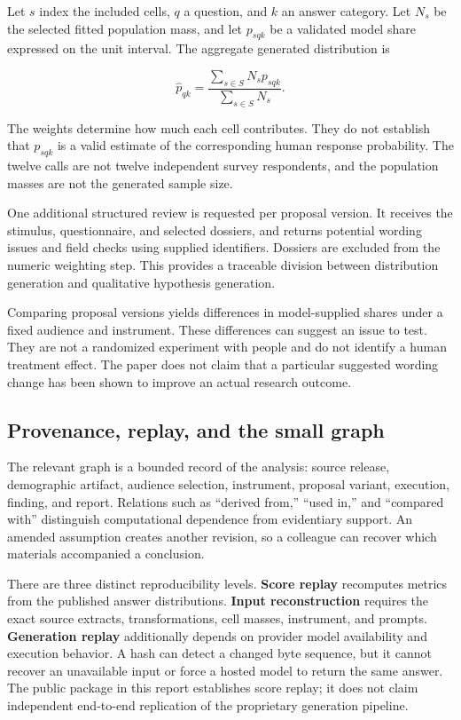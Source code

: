 \documentclass[
  11pt,
]{article}
\begin{document}
Let \(s\) index the included cells, \(q\) a question, and \(k\) an
answer category. Let \(N_s\) be the selected fitted population mass, and
let \(p_{sqk}\) be a validated model share expressed on the unit
interval. The aggregate generated distribution is

\[
\widehat{p}_{qk}=\frac{\sum_{s \in S} N_s p_{sqk}}{\sum_{s \in S} N_s}.
\]

The weights determine how much each cell contributes. They do not
establish that \(p_{sqk}\) is a valid estimate of the corresponding
human response probability. The twelve calls are not twelve independent
survey respondents, and the population masses are not the generated
sample size.

One additional structured review is requested per proposal version. It
receives the stimulus, questionnaire, and selected dossiers, and returns
potential wording issues and field checks using supplied identifiers.
Dossiers are excluded from the numeric weighting step. This provides a
traceable division between distribution generation and qualitative
hypothesis generation.

Comparing proposal versions yields differences in model-supplied shares
under a fixed audience and instrument. These differences can suggest an
issue to test. They are not a randomized experiment with people and do
not identify a human treatment effect. The paper does not claim that a
particular suggested wording change has been shown to improve an actual
research outcome.

\subsection{Provenance, replay, and the small
graph}\label{provenance-replay-and-the-small-graph}

The relevant graph is a bounded record of the analysis: source release,
demographic artifact, audience selection, instrument, proposal variant,
execution, finding, and report. Relations such as ``derived from,''
``used in,'' and ``compared with'' distinguish computational dependence
from evidentiary support. An amended assumption creates another
revision, so a colleague can recover which materials accompanied a
conclusion.

There are three distinct reproducibility levels. \textbf{Score replay}
recomputes metrics from the published answer distributions.
\textbf{Input reconstruction} requires the exact source extracts,
transformations, cell masses, instrument, and prompts.
\textbf{Generation replay} additionally depends on provider model
availability and execution behavior. A hash can detect a changed byte
sequence, but it cannot recover an unavailable input or force a hosted
model to return the same answer. The public package in this report
establishes score replay; it does not claim independent end-to-end
replication of the proprietary generation pipeline.
\end{document}
